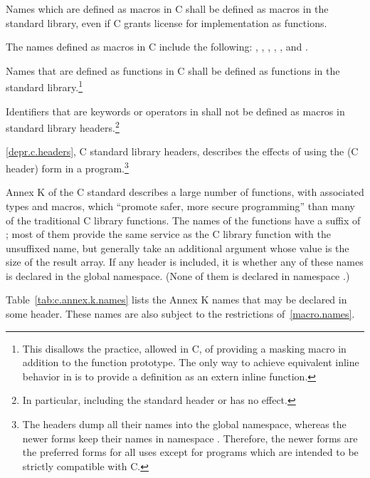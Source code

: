 \pnum
Names which are defined as macros in C shall be defined as macros in the \Cpp
standard library, even if C grants license for implementation as functions.
\begin{note} The names defined as macros in C include the following:
, , , ,
, and . \end{note}

\pnum
Names that are defined as functions in C shall be defined as functions in the
\Cpp standard library.\footnote{This disallows the practice, allowed in C, of
providing a masking macro in addition to the function prototype. The only way to
achieve equivalent inline behavior in \Cpp is to provide a definition as an
extern inline function.}

\pnum
Identifiers that are keywords or operators in \Cpp shall not be defined as
macros in \Cpp standard library headers.\footnote{In particular, including the
standard header  or  has no effect.}

\pnum
\ref{depr.c.headers}, C standard library headers, describes the effects of using
the  (C header) form in a \Cpp program.\footnote{ The
 headers dump all their names into the global namespace, whereas the
newer forms keep their names in namespace . Therefore, the newer
forms are the preferred forms for all uses except for \Cpp programs which are
intended to be strictly compatible with C. }

\pnum
Annex K of the C standard describes a large number of functions,
with associated types and macros,
which ``promote safer, more secure programming''
than many of the traditional C library functions.
The names of the functions have a suffix of ;
most of them provide the same service
as the C library function with the unsuffixed name,
but generally take an additional argument
whose value is the size of the result array.
If any \Cpp header is included,
it is 
whether any of these names
is declared in the global namespace.
(None of them is declared in namespace .)

\pnum
Table~\ref{tab:c.annex.k.names} lists the Annex K names
that may be declared in some header.
These names are also subject to the restrictions of~\ref{macro.names}.

